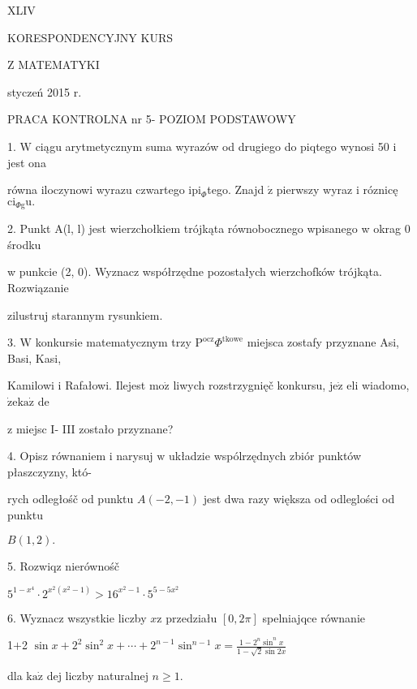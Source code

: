 \documentclass[a4paper,12pt]{article}
\begin{document}
XLIV

KORESPONDENCYJNY KURS

Z MATEMATYKI

styczeń 2015 r.

PRACA KONTROLNA nr 5- POZIOM PODSTAWOWY

1. $\mathrm{W}$ ciągu arytmetycznym suma wyrazów od drugiego do piqtego wynosi 50 $\mathrm{i}$ jest ona

równa iloczynowi wyrazu czwartego $\mathrm{i}\mathrm{p}\mathrm{i}_{\Phi}$tego. Znajd $\acute{\mathrm{z}}$ pierwszy wyraz $\mathrm{i}$ róznicę $\mathrm{c}\mathrm{i}_{\Phi \mathrm{g}}\mathrm{u}.$

2. Punkt A(l, l) jest wierzchołkiem trójkąta równobocznego wpisanego w okrag 0 środku

w punkcie (2, 0). Wyznacz współrzędne pozostałych wierzchofków trójkąta. Rozwiązanie

zilustruj starannym rysunkiem.

3. $\mathrm{W}$ konkursie matematycznym trzy $\mathrm{P}^{\mathrm{o}\mathrm{c}\mathrm{z}}\Phi^{\mathrm{t}\mathrm{k}\mathrm{o}\mathrm{w}\mathrm{e}}$ miejsca zostafy przyznane Asi, Basi, Kasi,

Kamilowi $\mathrm{i}$ Rafałowi. Ilejest $\mathrm{m}\mathrm{o}\dot{\mathrm{z}}$ liwych rozstrzygnięč konkursu, $\mathrm{j}\mathrm{e}\dot{\mathrm{z}}$ eli wiadomo, $\dot{\mathrm{z}}\mathrm{e}\mathrm{k}\mathrm{a}\dot{\mathrm{z}}$ de

$\mathrm{z}$ miejsc I- III zostało przyznane?

4. Opisz równaniem $\mathrm{i}$ narysuj $\mathrm{w}$ układzie wspólrzędnych zbiór punktów płaszczyzny, któ-

rych odległośč od punktu $A(-2,-1)$ jest dwa razy większa od odleglości od punktu

$B(1,2).$

5. Rozwiqz nierównośč

$5^{1-x^{4}}\cdot 2^{x^{2}(x^{2}-1)}>16^{x^{2}-1}\cdot 5^{5-5x^{2}}$

6. Wyznacz wszystkie liczby $x\mathrm{z}$ przedziału $[0,2\pi]$ spelniajqce równanie

1$+$2 $\displaystyle \sin x+2^{2}\sin^{2}x+\cdots+2^{n-1}\sin^{n-1}x=\frac{1-2^{n}\sin^{n}x}{1-\sqrt{2}\sin 2x}$

dla $\mathrm{k}\mathrm{a}\dot{\mathrm{z}}$ dej liczby naturalnej $n\geq 1.$
\end{document}
